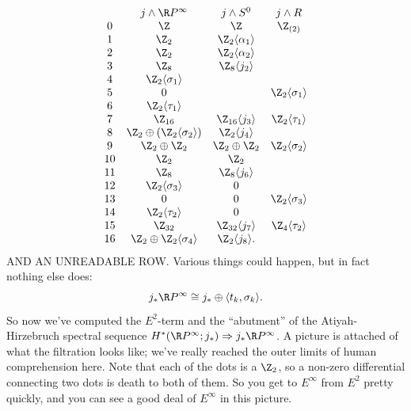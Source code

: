 \[
\begin{array}{cccc}
& j \sprod \RP^\infty & j \sprod S^0 & j \sprod R \\
0 & \Z & \Z & \Z_{(2)} \\
1 & \Z_2 & \Z_2 \langle \alpha_1 \rangle \\
2 & \Z_2 & \Z_2 \langle \alpha_2 \rangle \\
3 & \Z_8 & \Z_8 \langle j_2 \rangle \\
4 & \Z_2 \langle \sigma_1 \rangle \\
5 & 0 & & \Z_2 \langle \sigma_1 \rangle \\
6 & \Z_2 \langle \tau_1 \rangle \\
7 & \Z_{16} & \Z_{16} \langle j_3 \rangle & \Z_2 \langle \tau_1 \rangle \\
8 & \Z_2 \oplus (\Z_2 \langle \sigma_2 \rangle) & \Z_2 \langle j_4 \rangle \\
9 & \Z_2 \oplus \Z_2 & \Z_2 \oplus \Z_2 & \Z_2 \langle \sigma_2 \rangle \\
10 & \Z_2 & \Z_2 \\
11 & \Z_8 & \Z_8 \langle j_6 \rangle \\
12 & \Z_2 \langle \sigma_3 \rangle & 0 \\
13 & 0 & 0 & \Z_2 \langle \sigma_3 \rangle \\
14 & \Z_2 \langle \tau_2 \rangle  & 0 \\
15 & \Z_{32} & \Z_{32} \langle j_7 \rangle & \Z_4 \langle \tau_2 \rangle \\
16 & \Z_2 \oplus \Z_2 \langle \sigma_4 \rangle & \Z_2 \langle j_8 \rangle.
\end{array}
\]
AND AN UNREADABLE ROW.  Various things could happen, but in fact nothing else does:
\[
j_* \RP^\infty \cong j_* \oplus \langle t_k, \sigma_k \rangle.
\]
So now we've computed the $E^2$-term and the ``abutment'' of the Atiyah-Hirzebruch spectral sequence $H^*(\RP^\infty; j_*) \Rightarrow j_* \RP^\infty$.  A picture is attached of what the filtration looks like; we've really reached the outer limits of human comprehension here.  Note that each of the dots is a $\Z_2$, so a non-zero differential connecting two dots is death to both of them.  So you get to $E^\infty$ from $E^2$ pretty quickly, and you can see a good deal of $E^\infty$ in this picture.

